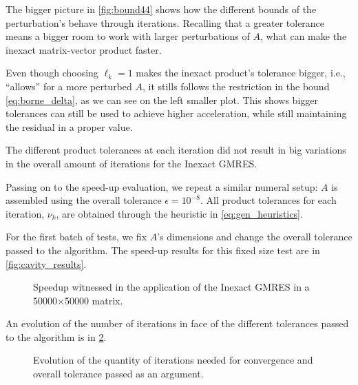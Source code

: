 The bigger picture in \autoref{fig:bound44} shows how the different bounds of the perturbation's behave through iterations. Recalling that a greater tolerance means a bigger room to work with larger perturbations of $A$, what can make the inexact matrix-vector product faster.

Even though choosing $\ell_{k} = 1$ makes the inexact product's tolerance bigger, i.e., “allows” for a more perturbed $A$, it stills follows the restriction in the bound \ref{eq:borne_delta}, as we can see on the left smaller plot. This shows bigger tolerances can still be used to achieve higher acceleration, while still maintaining the residual in a proper value.

The different product tolerances at each iteration did not result in big variations in the overall amount of iterations for the Inexact GMRES.

Passing on to the speed-up evaluation, we repeat a similar numeral setup: $A$ is assembled using the overall tolerance $\epsilon = 10^{-8}$. All product tolerances for each iteration, $\nu_{k}$, are obtained through the heuristic in \ref{eq:gen_heuristics}.

For the first batch of tests, we fix $A$'s dimensions and change the overall tolerance passed to the algorithm. The speed-up results for this fixed size test are in \autoref{fig:cavity_results}.

\begin{figure}[h!]
    \centering
    
    \caption{Speedup witnessed in the application of the Inexact GMRES in a 50000×50000 matrix.}
    \label{fig:cavity_results}
\end{figure}

An evolution of the number of iterations in face of the different tolerances passed to the algorithm is in \ref{fig:cavity_iterations}.

\begin{figure}[h!]
    \centering
    
    \caption{Evolution of the quantity of iterations needed for convergence and overall tolerance passed as an argument.}
    \label{fig:cavity_iterations}
\end{figure}



